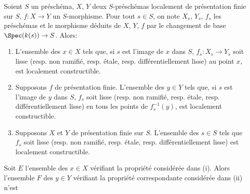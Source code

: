 \begin{proposition}[17.7.11]
\label{IV.17.7.11}
Soient $S$ un préschéma, $X$, $Y$ deux $S$-préschémas localement de présentation finie sur $S$, $f:X\to Y$ un $S$-morphisme. Pour tout $s\in S$, on note $X_s$, $Y_s$, $f_s$ les préschémas et le morphisme déduits de $X$, $Y$, $f$ par le changement de base $\Spec(k(s))\to S$. Alors:
\begin{enumerate}
  \item[(i)] L'ensemble des $x\in X$ tels que, si $s$ est l'image de $x$ dans $S$, $f_s:X_s\to Y_s$ soit lisse (resp. non ramifié, resp. étale, resp. différentiellement lisse) au point $x$, est localement constructible.
  \item[(ii)] Supposons $f$ de présentation finie. L'ensemble des $y\in Y$ tels que, si $s$ est l'image de $y$ dans $S$, $f_s$ soit lisse (resp. non ramifié, resp. étale, resp. différentiellement lisse) en tous les points de $f_s^{-1}(y)$, est localement constructible.
  \item[(iii)] Supposons $X$ et $Y$ de présentation finie sur $S$. L'ensemble des $s\in S$ tels que $f_s$ soit lisse (resp. non ramifié, resp. étale, resp. différentiellement lisse) est localement constructible.
\end{enumerate}
\end{proposition}

Soit $E$ l'ensemble des $x\in X$ vérifiant la propriété considérée dans (i). Alors l'ensemble $F$ des $y\in Y$ vérifiant la propriété correspondante considérée dans (ii) n'est

